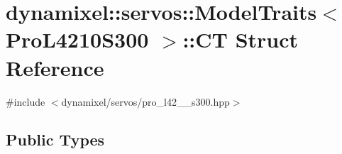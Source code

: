 \hypertarget{structdynamixel_1_1servos_1_1_model_traits_3_01_pro_l4210_s300_01_4_1_1_c_t}{}\section{dynamixel\+:\+:servos\+:\+:Model\+Traits$<$ Pro\+L4210\+S300 $>$\+:\+:CT Struct Reference}
\label{structdynamixel_1_1servos_1_1_model_traits_3_01_pro_l4210_s300_01_4_1_1_c_t}


{\ttfamily \#include $<$dynamixel/servos/pro\+\_\+l42\+\_\+\_\+s300.\+hpp$>$}

\subsection*{Public Types}
